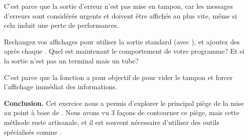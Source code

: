\documentclass[10pt]{article}\usepackage[nu]{esial}
\begin{document}
\begin{Exercice}
  C'est parce que la sortie d'erreur n'est pas mise en tampon, car les messages
  d'erreurs sont considérés urgents et doivent être affichés au plus vite, même
  si cela induit une perte de performances.

  \Question Rechangez vos affichages pour utiliser la sortie standard (avec
  ), et ajoutez des  après chaque .
  Quel est maintenant le comportement de votre programme? Et si la sortie n'est
  pas un terminal mais un tube?

  C'est parce que la fonction  a pour objectif de pour vider le
  tampon et forcer l'affichage immédiat des informations.

  \medskip

  \noindent\textbf{Conclusion.} Cet exercice nous a permis d'explorer le
  principal piège de la mise au point à base de . Nous avons vu 3
  façons de contourner ce piège, mais cette méthode reste artisanale, et il est
  souvent nécessaire d'utiliser des outils spécialisés comme .
\end{Exercice}
\newpage
\end{document}
